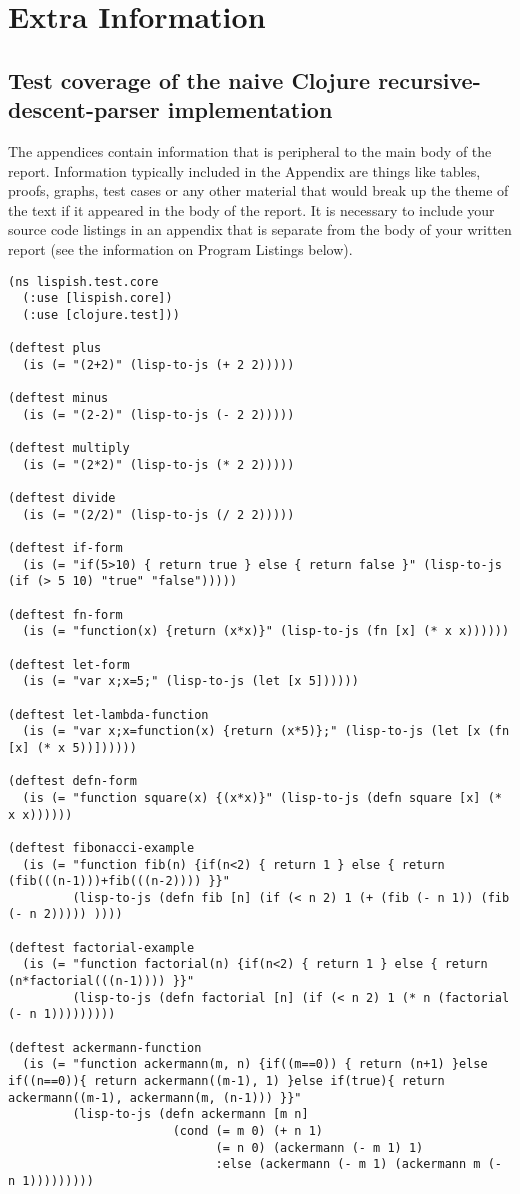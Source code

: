 

\chapter{Extra Information}
\section{Test coverage of the naive Clojure recursive-descent-parser implementation}
The appendices contain information that is peripheral to the main body of the report. Information typically included in the Appendix are things like tables, proofs, graphs, test cases or any other material that would break up the theme of the text if it appeared in the body of the report. It is necessary to include your source code listings in an appendix that is separate from the body of your written report (see the information on Program Listings below).

\begin{lstlisting}
(ns lispish.test.core
  (:use [lispish.core])
  (:use [clojure.test]))

(deftest plus
  (is (= "(2+2)" (lisp-to-js (+ 2 2)))))

(deftest minus
  (is (= "(2-2)" (lisp-to-js (- 2 2)))))

(deftest multiply
  (is (= "(2*2)" (lisp-to-js (* 2 2)))))

(deftest divide
  (is (= "(2/2)" (lisp-to-js (/ 2 2)))))

(deftest if-form
  (is (= "if(5>10) { return true } else { return false }" (lisp-to-js (if (> 5 10) "true" "false")))))

(deftest fn-form
  (is (= "function(x) {return (x*x)}" (lisp-to-js (fn [x] (* x x))))))

(deftest let-form
  (is (= "var x;x=5;" (lisp-to-js (let [x 5])))))

(deftest let-lambda-function
  (is (= "var x;x=function(x) {return (x*5)};" (lisp-to-js (let [x (fn [x] (* x 5))])))))

(deftest defn-form
  (is (= "function square(x) {(x*x)}" (lisp-to-js (defn square [x] (* x x))))))

(deftest fibonacci-example
  (is (= "function fib(n) {if(n<2) { return 1 } else { return (fib(((n-1)))+fib(((n-2)))) }}"
         (lisp-to-js (defn fib [n] (if (< n 2) 1 (+ (fib (- n 1)) (fib (- n 2))))) ))))

(deftest factorial-example
  (is (= "function factorial(n) {if(n<2) { return 1 } else { return (n*factorial(((n-1)))) }}"
         (lisp-to-js (defn factorial [n] (if (< n 2) 1 (* n (factorial (- n 1)))))))))

(deftest ackermann-function
  (is (= "function ackermann(m, n) {if((m==0)) { return (n+1) }else if((n==0)){ return ackermann((m-1), 1) }else if(true){ return ackermann((m-1), ackermann(m, (n-1))) }}"
         (lisp-to-js (defn ackermann [m n]
                       (cond (= m 0) (+ n 1)
                             (= n 0) (ackermann (- m 1) 1)
                             :else (ackermann (- m 1) (ackermann m (- n 1)))))))))

\end{lstlisting}
